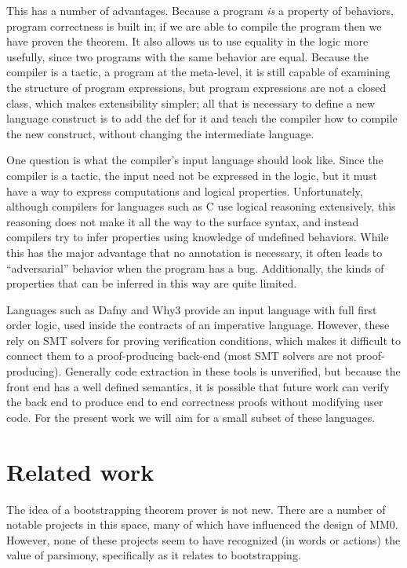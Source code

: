 \documentclass[runningheads]{llncs}
\newcommand{\mmO}{\textsf{MM0}}
\begin{document}
This has a number of advantages. Because a program \emph{is} a property of behaviors, program correctness is built in; if we are able to compile the program then we have proven the theorem. It also allows us to use equality in the logic more usefully, since two programs with the same behavior are equal. Because the compiler is a tactic, a program at the meta-level, it is still capable of examining the structure of program expressions, but program expressions are not a closed class, which makes extensibility simpler; all that is necessary to define a new language construct is to add the \textsf{def} for it and teach the compiler how to compile the new construct, without changing the intermediate language.

One question is what the compiler's input language should look like. Since the compiler is a tactic, the input need not be expressed in the logic, but it must have a way to express computations and logical properties. Unfortunately, although compilers for languages such as C use logical reasoning extensively, this reasoning does not make it all the way to the surface syntax, and instead compilers try to infer properties using knowledge of undefined behaviors. While this has the major advantage that no annotation is necessary, it often leads to ``adversarial'' behavior when the program has a bug. Additionally, the kinds of properties that can be inferred in this way are quite limited.

Languages such as Dafny \cite{dafny} and Why3 \cite{why3} provide an input language with full first order logic, used inside the contracts of an imperative language. However, these rely on SMT solvers for proving verification conditions, which makes it difficult to connect them to a proof-producing back-end (most SMT solvers are not proof-producing). Generally code extraction in these tools is unverified, but because the front end has a well defined semantics, it is possible that future work can verify the back end to produce end to end correctness proofs without modifying user code. For the present work we will aim for a small subset of these languages.

\section{Related work}\label{sec:related}
The idea of a bootstrapping theorem prover is not new. There are a number of notable projects in this space, many of which have influenced the design of \mmO. However, none of these projects seem to have recognized (in words or actions) the value of parsimony, specifically as it relates to bootstrapping.
\end{document}
